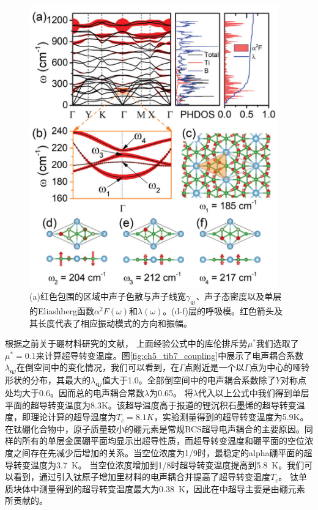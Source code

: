 \begin{figure}
  \includegraphics[width=0.96\textwidth]{figs/ch5_tib7_sc_all.png}
  \centering
  \caption{(a)红色包围的区域中声子色散与声子线宽$\gamma_{qj}$、声子态密度以及单层的Eliashberg函数$\alpha^2 F(\omega)$和$\lambda(\omega)$。(d-f)层的呼吸模。红色箭头及其长度代表了相应振动模式的方向和振幅。}
  \label{fig:ch5_tib7_sc_all}
\end{figure}

根据之前关于硼材料研究的文献\cite{penev2016can,zhao2016superconductivity,zhao2018multigap,liao2017phonon,yan2020superconductivity}，
上面经验公式中的库伦排斥势$\mu^*$我们选取了$\mu^*=0.1$来计算超导转变温度。图\ref{fig:ch5_tib7_coupling}中展示了电声耦合系数$\lambda_{\bm{q}j}$在倒空间中的变化情况，我们可以看到，在$\Gamma$点附近是一个以$\Gamma$点为中心的哑铃形状的分布，其最大的$\lambda_{\bm{q}j}$值大于\num{1.0}。全部倒空间中的电声耦合系数除了$Y$对称点处均大于\num{0.6}。因而总的电声耦合常数$\lambda$为\num{0.65}。
将$\lambda$代入以上公式中我们得到单层平面的超导转变温度为\num{8.3}K。该超导温度高于报道的锂沉积石墨烯的超导转变温度，即理论计算的超导温度为$T_c=8.1K$\cite{profeta2012phonon}，实验测量得到的超导转变温度为\num{5.9}K\cite{ludbrook2015evidence}。
在钛硼化合物中，原子质量较小的硼元素是常规BCS超导电声耦合的主要原因。同样的所有的单层金属硼平面均显示出超导性质，而超导转变温度和硼平面的空位浓度之间存在先减少后增加的关系。当空位浓度为\num{1/9}时，最稳定的alpha硼平面的超导转变温度为\SI{3.7}{\kelvin}。
当空位浓度增加到\num{1/8}时超导转变温度提高到\SI{5.8}{\kelvin}。我们可以看到，通过引入钛原子增加里材料的电声耦合并提高了超导转变温度$T_c$。
钛单质块体中测量得到的超导转变温度最大为\SI{0.38}{\kelvin}\cite{matthias1963superconductivity}，因此在中超导主要是由硼元素所贡献的。

